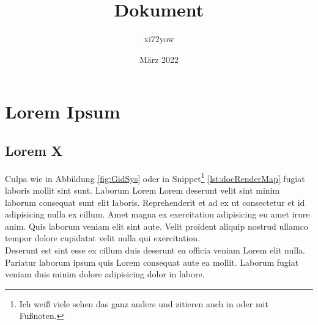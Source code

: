 \documentclass{scrreprt}
\title{Dokument}
\author{xi72yow}
\date{März 2022}
\begin{document}

\begin{titlepage}
	\maketitle
\end{titlepage}

\tableofcontents
\newpage

\chapter{Lorem Ipsum}


\section{Lorem X\cite{RPOI2003}}
Culpa wie in Abbildung \ref{fig:GidSys} oder in Snippet\footnote{Ich weiß viele	sehen das ganz anders und zitieren auch in oder mit Fußnoten.} \ref{lst:docRenderMap} fugiat laboris mollit sint sunt. Laborum Lorem Lorem deserunt velit sint minim laborum consequat sunt elit laboris. Reprehenderit et ad ex ut consectetur et id adipisicing nulla ex cillum. Amet magna ex exercitation adipisicing eu amet irure anim. Quis laborum veniam elit sint aute. Velit proident aliquip nostrud ullamco tempor dolore cupidatat velit nulla qui exercitation. \\

Deserunt est sint esse ex cillum duis deserunt ea officia veniam Lorem elit nulla. Pariatur laborum ipsum quis Lorem consequat aute ea mollit. Laborum fugiat veniam duis minim dolore adipisicing dolor in labore.
\end{document}
